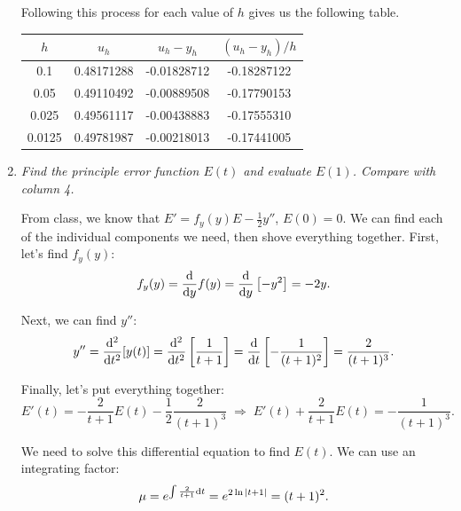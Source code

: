 \begin{enumerate}[label=(\alph*)]
      Following this process for each value of $h$ gives us the following table.
      \begin{table}[h!]
      \centering
      \begin{tabular}{|c|c|c|c|}
        \hline
        \rule{0pt}{3ex}$h$ & $u_{h}$ & $u_{h}-y_{h}$ & $(u_{h}-y_{h})/h$ \\
        \hline
        0.1    & 0.48171288 & -0.01828712 & -0.18287122 \\
        0.05   & 0.49110492 & -0.00889508 & -0.17790153 \\
        0.025  & 0.49561117 & -0.00438883 & -0.17555310 \\
        0.0125 & 0.49781987 & -0.00218013 & -0.17441005 \\ 
        \hline
      \end{tabular}
    \end{table}

    \item \textit{Find the principle error function $E(t)$ and evaluate $E(1)$. Compare with column 4.}
      \vspace{1em}

      From class, we know that $E' = f_{y}(y)E - \frac{1}{2}y''$, $E(0)=0$. We can find each of the individual components we need, then shove everything together. First, let's find $f_{y}(y)$:
      \begin{equation*}
        f_{y}(y) = \dv{y}f(y) = \dv{y} \left[-y^{2}\right] = -2y.
      \end{equation*}

      Next, we can find $y''$:
      \begin{equation*}
        y'' = \frac{\mathrm{d}^{2}}{\mathrm{d}t^{2}}[y(t)] = \frac{\mathrm{d}^{2}}{\mathrm{d}t^{2}} \left[\frac{1}{t+1}\right] = \dv{t} \left[-\frac{1}{(t+1)^{2}}\right] = \frac{2}{(t+1)^{3}}.
      \end{equation*}

      Finally, let's put everything together:
      \begin{equation*}
        E'(t) = -\frac{2}{t+1} E(t) - \frac{1}{2} \frac{2}{(t+1)^{3}} \;\Rightarrow\; E'(t) + \frac{2}{t+1}E(t) = -\frac{1}{(t+1)^{3}}.
      \end{equation*}

      We need to solve this differential equation to find $E(t)$. We can use an integrating factor:
      \begin{equation*}
        \mu = e^{\int \frac{2}{t+1} \mathrm{d}t} = e^{2\ln{\abs{t+1}}} = (t+1)^{2}.
      \end{equation*}


\end{enumerate}
